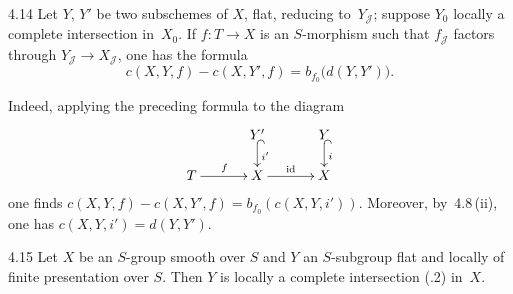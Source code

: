 \begin{corollary}{4.14}\label{III.4.14}
Let \(Y\), \(Y'\) be two subschemes of \(X\), flat, reducing
to~\(Y_{\mathcal{J}}\); suppose \(Y_0\) locally a complete intersection
in~\(X_0\). If \(f\colon T\to X\) is an \(S\)-morphism such that
\(f_{\mathcal{J}}\) factors through
\(Y_{\mathcal{J}}\to X_{\mathcal{J}}\), one has the formula
\[
c(X,Y,f)-c(X,Y',f)=b_{f_0}\bigl(d(Y,Y')\bigr).
\]
\end{corollary}

Indeed, applying the preceding formula to the diagram
\[
\xymatrix@C=3.2em@R=1.6em{
& Y' \ar@{^{(}->}[d]^{i'} & Y \ar@{^{(}->}[d]^{i} \\
T \ar[r]^{f} & X \ar[r]^{\mathrm{id}} & X
}
\]
one finds \(c(X,Y,f)-c(X,Y',f)=b_{f_0}(c(X,Y,i'))\). Moreover, by~4.8\,(ii),
one has \(c(X,Y,i')=d(Y,Y')\).

\begin{proposition}{4.15}\label{III.4.15}
Let \(X\) be an \(S\)-group smooth over \(S\) and \(Y\) an \(S\)-subgroup flat
and locally of finite presentation over \(S\). Then \(Y\) is locally a
complete intersection (.2) in~\(X\).
\end{proposition}

